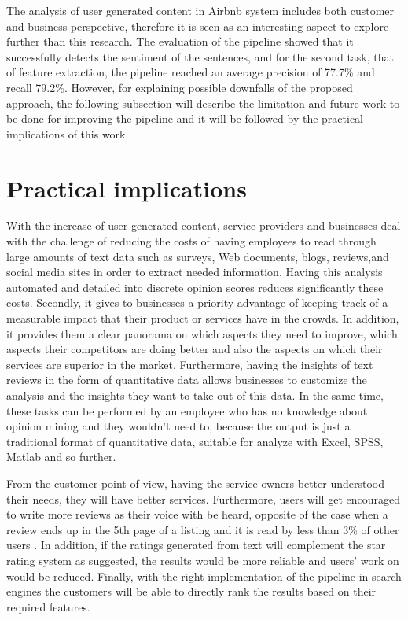 The analysis of user generated content in Airbnb system includes both customer and business perspective, therefore it is seen as an interesting aspect to explore further than this research. The evaluation of the pipeline showed that it successfully detects the sentiment of the sentences, and for the second task, that of feature extraction, the pipeline reached an average precision of 77.7\% and recall 79.2\%. However, for explaining possible downfalls of the proposed approach, the following subsection will describe the limitation and future work to be done for improving the pipeline and it will be followed by the practical implications of this work. 

\section{Practical implications}
With the increase of user generated content, service providers and businesses deal with the challenge of reducing the costs of having employees to read through large amounts of text data such as
surveys, Web documents, blogs, reviews,and social media sites in order to extract needed information. Having this analysis automated and detailed into discrete opinion scores reduces significantly these costs. Secondly, it gives to businesses a priority advantage of keeping track of a measurable impact that their product or services have in the crowds. In addition, it provides them a clear panorama on which aspects they need to improve, which aspects their competitors are doing better and also the aspects on which their services are superior in the market. Furthermore, having the insights of text reviews in the form of quantitative data allows businesses to customize the analysis and the insights they want to take out of this data. In the same time, these tasks can be performed by an employee who has no knowledge about opinion mining and they wouldn't need to, because the output is just a traditional format of quantitative data, suitable for analyze with Excel, SPSS, Matlab and so further.

From the customer point of view, having the service owners better understood their needs, they will have better services. Furthermore, users will get encouraged to write more reviews as their voice with be heard, opposite of the case when a review ends up in the 5th page of a listing and it is read by less than 3\% of other users \cite{pavlou2006institutional}. In addition, if the ratings generated from text will complement the star rating system as suggested, the results would be more reliable and users' work on would be reduced. Finally, with the right implementation of the pipeline in search engines the customers will be able to directly rank the results based on their required features. 

